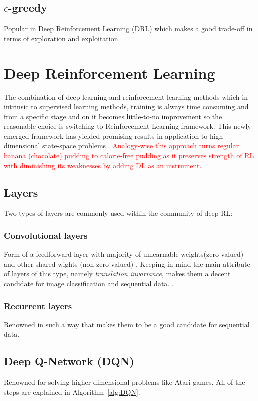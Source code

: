\documentclass[a4paper,12pt]{article}
\begin{document}
\subsection{$\epsilon$-greedy}
Popular in Deep Reinforcement Learning (DRL) which makes a good trade-off in terms of exploration and exploitation.

\section{Deep Reinforcement Learning}
The combination of deep learning and reinforcement learning methods which in intrinsic to supervised learning methods, training is always time consuming and from a specific stage and on it becomes little-to-no improvement so the reasonable choice is switching to Reinforcement Learning framework. This newly emerged framework has yielded promising results in application to high dimensional state-space problems \cite{Francois-Lavet2018}. \textcolor{red}{ Analogy-wise this approach turns regular banana (chocolate) pudding to calorie-free pudding as it preserves strength of RL with diminishing its weaknesses by adding DL as an instrument.}

\subsection{Layers}
Two types of layers are commonly used within the community of deep RL:

\subsubsection{Convolutional layers}
Form of a feedforward layer with majority of unlearnable weights(zero-valued) and other shared wights (non-zero-valued) \cite{Francois-Lavet2018}. Keeping in mind the main attribute of layers of this type, namely \textit{translation invariance}, makes them a decent candidate for image classification and sequential data. \cite{lecun1995a, Francois-Lavet2018}.

\subsubsection{Recurrent layers}
Renowned in such a way that makes them to be a good candidate for sequential data.


\subsection{Deep Q-Network (DQN)}
Renowned for solving higher dimensional problems like Atari games. All of the steps are explained in Algorithm~\ref{alg:DQN}.
\end{document}
